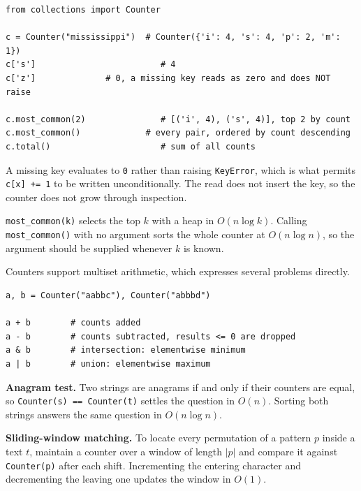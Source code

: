 \begin{lstlisting}[style=python, caption={Counter}]
from collections import Counter

c = Counter("mississippi")  # Counter({'i': 4, 's': 4, 'p': 2, 'm': 1})
c['s']                         # 4
c['z']              # 0, a missing key reads as zero and does NOT raise

c.most_common(2)               # [('i', 4), ('s', 4)], top 2 by count
c.most_common()             # every pair, ordered by count descending
c.total()                      # sum of all counts
\end{lstlisting}

\vspace{-2ex}

A missing key evaluates to \texttt{0} rather than raising \texttt{KeyError},
which is what permits \texttt{c[x] += 1} to be written unconditionally. The
read does not insert the key, so the counter does not grow through inspection.

\texttt{most\_common(k)} selects the top $k$ with a heap in $O(n \log k)$.
Calling \texttt{most\_common()} with no argument sorts the whole counter at
$O(n \log n)$, so the argument should be supplied whenever $k$ is known.

Counters support multiset arithmetic, which expresses several problems
directly.

\begin{lstlisting}[style=python, caption={Counter arithmetic}]
a, b = Counter("aabbc"), Counter("abbbd")

a + b        # counts added
a - b        # counts subtracted, results <= 0 are dropped
a & b        # intersection: elementwise minimum
a | b        # union: elementwise maximum
\end{lstlisting}

\begin{keybox}
\textbf{Anagram test.} Two strings are anagrams if and only if their counters
are equal, so \texttt{Counter(s) == Counter(t)} settles the question in $O(n)$.
Sorting both strings answers the same question in $O(n \log n)$.

\medskip

\textbf{Sliding-window matching.} To locate every permutation of a pattern $p$
inside a text $t$, maintain a counter over a window of length $|p|$ and
compare it against \texttt{Counter(p)} after each shift. Incrementing the
entering character and decrementing the leaving one updates the window in
$O(1)$.
\end{keybox}

